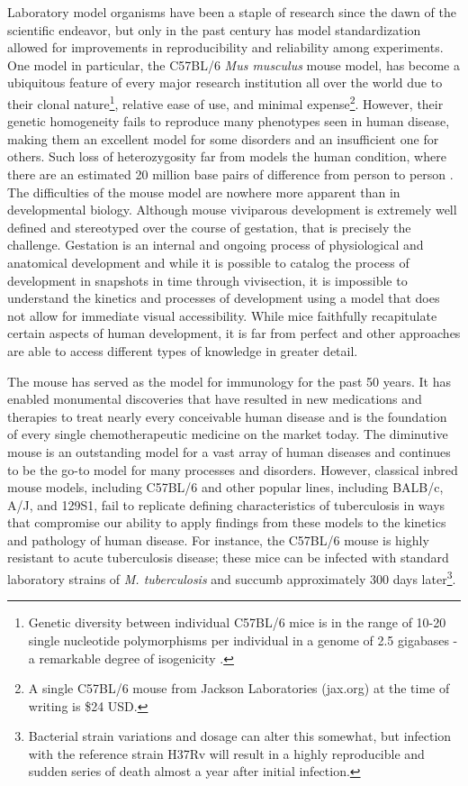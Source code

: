 Laboratory model organisms have been a staple of research since the dawn of the scientific endeavor, but only in the past century has model standardization allowed for improvements in reproducibility and reliability among experiments. One model in particular, the C57BL/6 \textit{Mus musculus} mouse model, has become a ubiquitous feature of every major research institution all over the world due to their clonal nature\footnote{Genetic diversity between individual C57BL/6 mice is in the range of 10-20 single nucleotide polymorphisms per individual in a genome of 2.5 gigabases - a remarkable degree of isogenicity \cite{Bryant2011}.}, relative ease of use, and minimal expense\footnote{A single C57BL/6 mouse from Jackson Laboratories (jax.org) at the time of writing is \$24 USD.}. However, their genetic homogeneity fails to reproduce many phenotypes seen in human disease, making them an excellent model for some disorders and an insufficient one for others. Such loss of heterozygosity far from models the human condition, where there are an estimated 20 million base pairs of difference from person to person \cite{Genomes2015}. The difficulties of the mouse model are nowhere more apparent than in developmental biology. Although mouse viviparous development is extremely well defined and stereotyped over the course of gestation, that is precisely the challenge. Gestation is an internal and ongoing process of physiological and anatomical development and while it is possible to catalog the process of development in snapshots in time through vivisection, it is impossible to understand the kinetics and processes of development using a model that does not allow for immediate visual accessibility. While mice faithfully recapitulate certain aspects of human development, it is far from perfect and other approaches are able to access different types of knowledge in greater detail.

The mouse has served as the model for immunology for the past 50 years. It has enabled monumental discoveries that have resulted in new medications and therapies to treat nearly every conceivable human disease and is the foundation of every single chemotherapeutic medicine on the market today. The diminutive mouse is an outstanding model for a vast array of human diseases and continues to be the go-to model for many processes and disorders. However, classical inbred mouse models, including C57BL/6 and other popular lines, including BALB/c, A/J, and 129S1, fail to replicate defining characteristics of tuberculosis in ways that compromise our ability to apply findings from these models to the kinetics and pathology of human disease. For instance, the C57BL/6 mouse is highly resistant to acute tuberculosis disease; these mice can be infected with standard laboratory strains of \textit{M. tuberculosis} and succumb approximately 300 days later\footnote{Bacterial strain variations and dosage can alter this somewhat, but infection with the reference strain H37Rv will result in a highly reproducible and sudden series of death almost a year after initial infection.}. 

